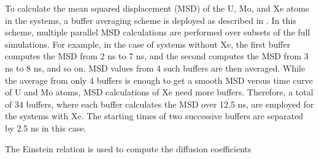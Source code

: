 \documentclass{elsarticle}
\providecommand{\DIFadd}[1]{{\protect\color{blue} \sf #1}} %
\providecommand{\DIFdel}[1]{}
\providecommand{\DIFaddbegin}{} %
\providecommand{\DIFaddend}{} %
\providecommand{\DIFdelbegin}{} %
\providecommand{\DIFdelend}{} %
\begin{document}
\DIFaddend To calculate the mean squared displacement (MSD) of the U, Mo, and Xe atoms in the \DIFdelbegin \DIFdel{GB}\DIFdelend \DIFaddbegin \DIFadd{systems}\DIFaddend , a buffer averaging scheme is deployed as described in \cite{rapaport2004}. In this scheme, multiple parallel MSD calculations are performed over subsets of the full simulations. For example, in the case of systems without Xe, the first buffer computes the MSD from 2 ns to 7 ns, and the second computes \DIFaddbegin \DIFadd{the }\DIFaddend MSD from 3 ns to 8 ns, and so on. MSD values from 4 such buffers are then averaged. While the average from only 4 buffers is enough to get a smooth MSD versus time curve of U and Mo atoms, MSD calculations of Xe need more buffers. Therefore, a total of 34 buffers, where each buffer calculates the MSD over 12.5 ns, are employed for the systems with Xe. The starting times of two successive buffers are separated by 2.5 ns in this case.
\DIFdelbegin \DIFdel{Once the buffer-averaged MSD values are available as a function of time, the Einstein relation can be }\DIFdelend \DIFaddbegin 

\DIFadd{The Einstein relation is }\DIFaddend used to compute the diffusion coefficients \DIFdelbegin \DIFdel{. The diffusion coefficients in the GB can then be calculated from Eq. \ref{eq:ein}:
}%
\end{document}
